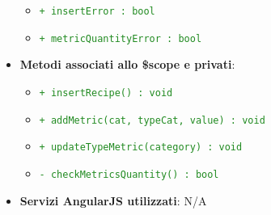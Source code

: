 \begin{itemize}
\begin{itemize}
						\item \textcolor{forestgreen}{\texttt{+ insertError : bool}}
						\item \textcolor{forestgreen}{\texttt{+ metricQuantityError : bool}}
					\end{itemize}

				\item \textbf{Metodi associati allo \$scope e privati}:
					\begin{itemize}
						\item \textcolor{forestgreen}{\texttt{+ insertRecipe() : void}}
						\item \textcolor{forestgreen}{\texttt{+ addMetric(cat, typeCat, value) : void}}
						\item \textcolor{forestgreen}{\texttt{+ updateTypeMetric(category) : void}}
						\item \textcolor{forestgreen}{\texttt{- checkMetricsQuantity() : bool}}
					\end{itemize}

				\item \textbf{Servizi AngularJS utilizzati}: N/A

			\end{itemize}

